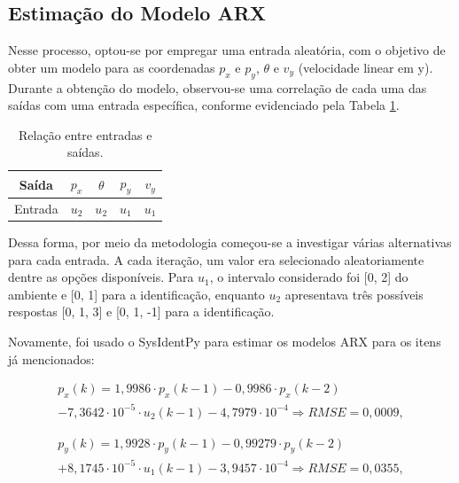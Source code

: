 \documentclass[12pt,           %
a4paper,                       %
openany,                       %
oneside,                       %
chapter=TITLE,                 %
english,                       %
spanish,                       %
brazil,                        %
sumario=tradicional]{abntex2}  %
\begin{document}
\begin{OnehalfSpace}
\subsection{Estimação do Modelo ARX}
\label{subsec:GPCforLL}  

Nesse processo, optou-se por empregar uma entrada aleatória, com o objetivo de obter um modelo para as coordenadas $p_x$ e $p_y$, $\theta$ e $v_y$ (velocidade linear em y). Durante a obtenção do modelo, observou-se uma correlação de cada uma das saídas com uma entrada específica, conforme evidenciado pela Tabela \ref{tab:intlla}.

\begin{table}[H]
	\centering
	\vspace*{-.2cm}
	\caption{Relação entre entradas e saídas.}
	\begin{tabular}{|c|c|c|c|c|}
			\hline
             Saída & $p_x$ & $\theta$ & $p_y$ & $v_y$ \\
            \hline
            Entrada & $u_2$ & $u_2$ & $u_1$ & $u_1$\\ 
            \hline
	\end{tabular}  
    \label{tab:intlla}                 %
\end{table}
\vspace*{-0.7cm}
{\raggedright {}}

Dessa forma, por meio da metodologia começou-se a investigar várias alternativas para cada entrada. A cada iteração, um valor era selecionado aleatoriamente dentre as opções disponíveis. Para $u_1$, o intervalo considerado foi [0, 2] do ambiente e [0, 1] para a identificação, enquanto $u_2$ apresentava três possíveis respostas [0, 1, 3] e [0, 1, -1] para a identificação.

 Novamente, foi usado o SysIdentPy para estimar os modelos ARX para os itens já mencionados:

\begin{equation}
\begin{matrix}
    p_x(k) = 1,9986\cdot p_x(k-1) -0,9986 \cdot p_x(k-2)\\
    -7,3642\cdot 10^{-5}\cdot u_2(k-1) -4,7979\cdot 10^{-4}\Rightarrow RMSE=0,0009,
\end{matrix} 
\end{equation}

\begin{equation}
\begin{matrix}
    p_y(k) = 1,9928\cdot p_y(k-1) - 0,99279\cdot p_y(k-2)\\
    +8,1745\cdot 10^{-5}\cdot u_1(k-1) -3,9457\cdot 10^{-4}\Rightarrow RMSE=0,0355,
\end{matrix} 
\end{equation}


\end{OnehalfSpace}
\end{document}

